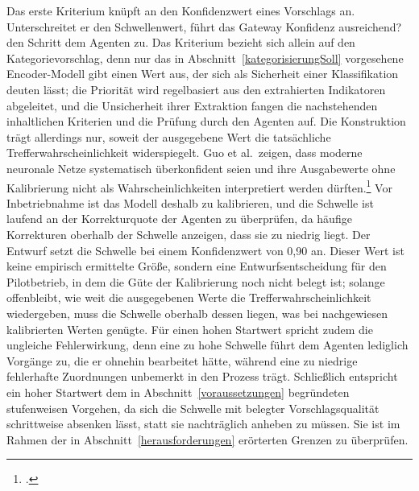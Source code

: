 Das erste Kriterium kn\"upft an den Konfidenzwert eines Vorschlags an. Unterschreitet er den Schwellenwert, f\"uhrt das Gateway \glqq Konfidenz ausreichend?\grqq{} den Schritt dem Agenten zu. Das Kriterium bezieht sich allein auf den Kategorievorschlag, denn nur das in Abschnitt~\ref{kategorisierungSoll} vorgesehene Encoder-Modell gibt einen Wert aus, der sich als Sicherheit einer Klassifikation deuten l\"asst; die Priorit\"at wird regelbasiert aus den extrahierten Indikatoren abgeleitet, und die Unsicherheit ihrer Extraktion fangen die nachstehenden inhaltlichen Kriterien und die Pr\"ufung durch den Agenten auf. Die Konstruktion tr\"agt allerdings nur, soweit der ausgegebene Wert die tats\"achliche Trefferwahrscheinlichkeit widerspiegelt. Guo et al.~zeigen, dass moderne neuronale Netze systematisch \"uberkonfident seien und ihre Ausgabewerte ohne Kalibrierung nicht als Wahrscheinlichkeiten interpretiert werden d\"urften.\footcite[Vgl.][hier S.~1322]{Guo2017} Vor Inbetriebnahme ist das Modell deshalb zu kalibrieren, und die Schwelle ist laufend an der Korrekturquote der Agenten zu \"uberpr\"ufen, da h\"aufige Korrekturen oberhalb der Schwelle anzeigen, dass sie zu niedrig liegt. Der Entwurf setzt die Schwelle bei einem Konfidenzwert von 0,90 an. Dieser Wert ist keine empirisch ermittelte Gr\"o{\ss}e, sondern eine Entwurfsentscheidung f\"ur den Pilotbetrieb, in dem die G\"ute der Kalibrierung noch nicht belegt ist; solange offenbleibt, wie weit die ausgegebenen Werte die Trefferwahrscheinlichkeit wiedergeben, muss die Schwelle oberhalb dessen liegen, was bei nachgewiesen kalibrierten Werten gen\"ugte. F\"ur einen hohen Startwert spricht zudem die ungleiche Fehlerwirkung, denn eine zu hohe Schwelle f\"uhrt dem Agenten lediglich Vorg\"ange zu, die er ohnehin bearbeitet h\"atte, w\"ahrend eine zu niedrige fehlerhafte Zuordnungen unbemerkt in den Prozess tr\"agt. Schlie{\ss}lich entspricht ein hoher Startwert dem in Abschnitt~\ref{voraussetzungen} begr\"undeten stufenweisen Vorgehen, da sich die Schwelle mit belegter Vorschlagsqualit\"at schrittweise absenken l\"asst, statt sie nachtr\"aglich anheben zu m\"ussen. Sie ist im Rahmen der in Abschnitt~\ref{herausforderungen} er\"orterten Grenzen zu \"uberpr\"ufen.

